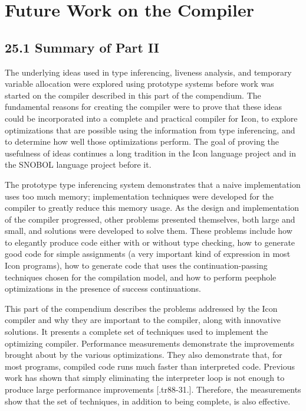 \chapter{Future Work on the Compiler}

\section[25.1 Summary of Part II]{25.1 Summary of Part II}

The underlying ideas used in type inferencing, liveness analysis, and
temporary variable allocation were explored using prototype systems
before work was started on the compiler described in this part of the
compendium. The fundamental reasons for creating the compiler were
to prove that these ideas could be incorporated into a complete and
practical compiler for Icon, to explore optimizations that are
possible using the information from type inferencing, and to determine
how well those optimizations perform. The goal of proving the
usefulness of ideas continues a long tradition in the Icon language
project and in the SNOBOL language project before it.

The prototype type inferencing system demonstrates that a naive
implementation uses too much memory; implementation techniques were
developed for the compiler to greatly reduce this memory usage. As the
design and implementation of the compiler progressed, other problems
presented themselves, both large and small, and solutions were
developed to solve them. These problems include how to elegantly
produce code either with or without type checking, how to generate
good code for simple assignments (a very important kind of expression
in most Icon programs), how to generate code that uses the
continuation-passing techniques chosen for the compilation model, and
how to perform peephole optimizations in the presence of success
continuations.

This part of the compendium describes the problems addressed by the Icon
compiler and why they are important to the compiler, along with
innovative solutions. It presents a complete set of techniques used to
implement the optimizing compiler.  Performance measurements
demonstrate the improvements brought about by the various
optimizations. They also demonstrate that, for most programs, compiled
code runs much faster than interpreted code. Previous work has shown
that simply eliminating the interpreter loop is not enough to produce
large performance improvements [.tr88-31.]. Therefore, the
measurements show that the set of techniques, in addition to being
complete, is also effective.


